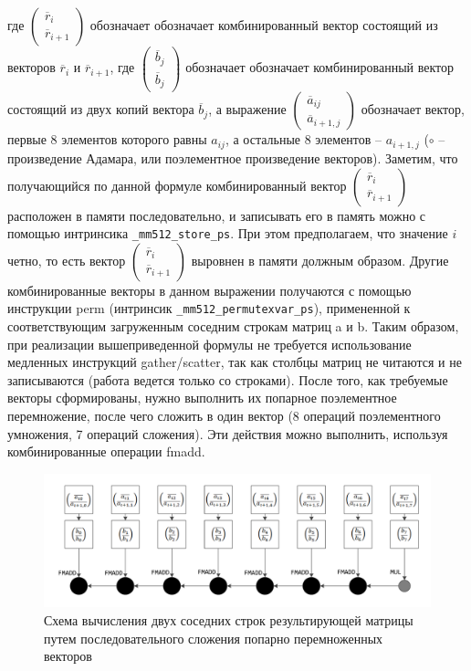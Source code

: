 где $\begin{pmatrix}\overline{r}_i \\ \overline{r}_{i + 1}\end{pmatrix}$ обозначает обозначает комбинированный вектор состоящий из векторов $\overline{r}_i$ и $\overline{r}_{i + 1}$, где $\begin{pmatrix}\overline{b}_j \\ \overline{b}_j\end{pmatrix}$ обозначает обозначает комбинированный вектор состоящий из двух копий вектора $\overline{b}_j$, а выражение $\begin{pmatrix}\overline{a}_{ij} \\ \overline{a}_{i + 1,j}\end{pmatrix}$ обозначает вектор, первые 8 элементов которого равны $a_{ij}$, а остальные 8 элементов -- $a_{i + 1,j}$ ($\circ$ -- произведение Адамара, или поэлементное произведение векторов).
Заметим, что получающийся по данной формуле комбинированный вектор $\begin{pmatrix}\overline{r}_i \\ \overline{r}_{i + 1}\end{pmatrix}$ расположен в памяти последовательно, и записывать его в память можно с помощью интринсика \texttt{\_mm512\_store\_ps}.
При этом предполагаем, что значение $i$ четно, то есть вектор $\begin{pmatrix}\overline{r}_i \\ \overline{r}_{i + 1}\end{pmatrix}$ выровнен в памяти должным образом.
Другие комбинированные векторы в данном выражении получаются с помощью инструкции perm (интринсик \texttt{\_mm512\_permutexvar\_ps}), примененной к соответствующим загруженным соседним строкам матриц a и b.
Таким образом, при реализации вышеприведенной формулы не требуется использование медленных инструкций gather/scatter, так как столбцы матриц не читаются и не записываются (работа ведется только со строками). После того, как требуемые векторы сформированы, нужно выполнить их попарное поэлементное перемножение, после чего сложить в один вектор (8 операций поэлементного умножения, 7 операций сложения).
Эти действия можно выполнить, используя комбинированные операции fmadd.

\begin{figure}[ht]
	\centering
		\includegraphics[width=1.00\textwidth]{./pics/text_4_spec_matr/fmadd.pdf}
	\caption{Схема вычисления двух соседних строк результирующей матрицы путем последовательного сложения попарно перемноженных векторов}
	\label{fig:text_4_spec_matr_fmadd}
\end{figure}

